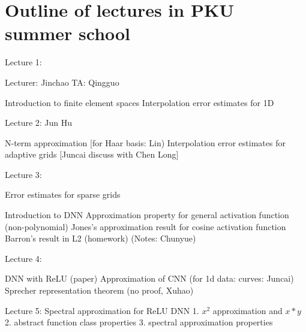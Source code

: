 \chapter{Outline of lectures in PKU summer school}

Lecture 1:  

Lecturer: Jinchao
TA:	  Qingguo

Introduction to finite element spaces
Interpolation error estimates for 1D

Lecture 2:  Jun Hu

N-term approximation [for Haar basis: Lin)
Interpolation error estimates for adaptive grids [Juncai discuss with Chen Long]

Lecture 3:  

Error estimates for sparse grids  
 
Introduction to DNN
Approximation property for general activation function (non-polynomial)
Jones's approximation result for cosine activation function
Barron's result in L2 (homework) 
(Notes: Chunyue)
 
Lecture 4:

DNN with ReLU (paper)
Approximation of CNN (for 1d data: curves:  Juncai) 
Sprecher representation theorem (no proof, Xuhao)

Lecture 5: Spectral approximation for ReLU DNN
1. $x^2$ approximation and $x*y$
2. abstract function class properties
3. spectral approximation properties



 
